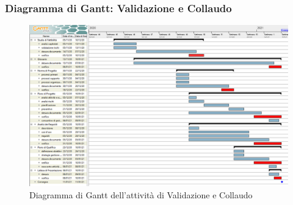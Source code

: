 \subsubsection{Diagramma di Gantt: Validazione e Collaudo}
\begin{figure}[h]
	\includegraphics[scale=0.45]{img/gant-analisi.PNG}
	\caption{Diagramma di Gantt dell'attività di Validazione e Collaudo}
\end{figure}